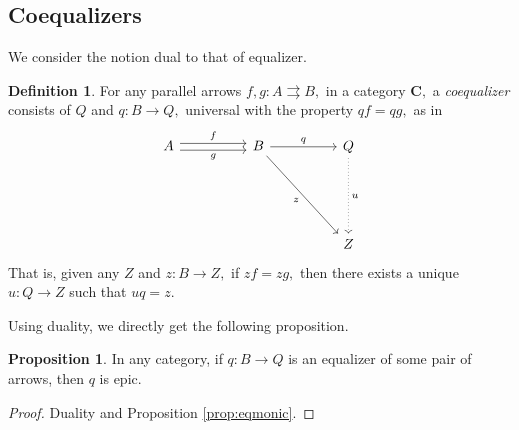 \documentclass[11pt,leqno,landscape,semhelv]{seminar}
\theoremstyle{definition}
\newtheorem{prop}[thm]{Proposition}
\newtheorem{defn}[thm]{Definition}
\numberwithin{joke}{section}
\numberwithin{thm}{section}
\numberwithin{equation}{section}
\newcommand{\tto}{\rightrightarrows}
\begin{document}
\subsection{Coequalizers}
We consider the notion dual to that of equalizer.
\begin{defn} 
  For any parallel arrows $f, g:A \tto B,$ in a category $\mathbf{C},$ a \emph{coequalizer} consists of $Q$ and $q:B \to Q,$ universal with the property $qf = qg,$ as in
  \begin{equation*} 
    \begin{tikzcd}
    A \arrow[rr, "g"', shift right] \arrow[rr, "f", shift left] && 
    B \arrow[rr, "q"] \arrow[rrddd, "z"'] &  & Q \arrow[ddd, "u", dotted] \\
    &&&&\\&&&&\\
    &&&& Z
    \end{tikzcd}
  \end{equation*}
  That is, given any $Z$ and $z:B\to Z,$ if $zf = zg,$ then there exists a unique $u:Q \to Z$ such that $uq = z.$
\end{defn}
Using duality, we directly get the following proposition.
\begin{prop}
  In any category, if $q:B\to Q$ is an equalizer of some pair of arrows, then $q$ is epic.
\end{prop}
\begin{proof} 
  Duality and Proposition \ref{prop:eqmonic}.
\end{proof}

\end{document}
